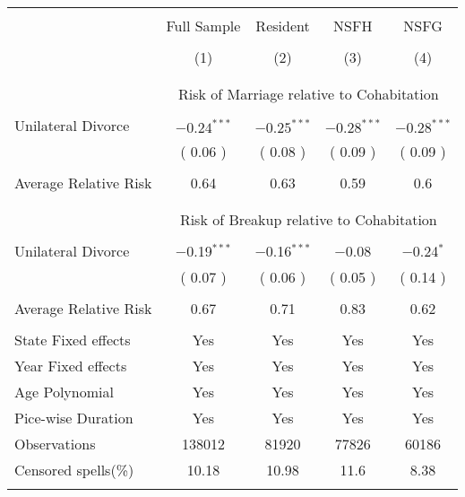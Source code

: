 \footnotesize 
\begin{tabular}{@{\extracolsep{5pt}}lcccc} 
\\[-1.8ex]\hline 
\hline 
\\[-1.8ex] & \multicolumn{1}{c}{Full Sample} & \multicolumn{1}{c}{Resident}& \multicolumn{1}{c}{NSFH}& \multicolumn{1}{c}{NSFG} \\ 
\\[-1.8ex] & \multicolumn{1}{c}{(1)} & \multicolumn{1}{c}{(2)} & \multicolumn{1}{c}{(3)} & \multicolumn{1}{c}{(4)}\\ 
\hline \\[-1.8ex] 
\\[-2.2ex] & \multicolumn{4}{c}{Risk of Marriage relative to Cohabitation} \\  
 \hline \\[-1.8ex]
 Unilateral Divorce &  $-0.24^{***}$  &  $-0.25^{***}$  &  $-0.28^{***}$  &  $-0.28^{***}$  \\ 
  & ( 0.06 ) & ( 0.08 ) & ( 0.09 ) & ( 0.09 ) \\  
 \hline \\[-1.8ex]
 Average Relative Risk &  0.64  &  0.63  &  0.59  &  0.6  \\ 
 \hline \\[-1.8ex]
 \\[-2.2ex] & \multicolumn{4}{c}{Risk of Breakup relative to Cohabitation} \\  
 \hline \\[-1.8ex]
 Unilateral Divorce &  $-$0.19$^{***}$  &  $-$0.16$^{***}$  &  $-$0.08  &  $-$0.24$^{*}$  \\ 
  & ( 0.07 ) & ( 0.06 ) & ( 0.05 ) & ( 0.14 ) \\  
 \hline \\[-1.8ex]
 Average Relative Risk &  0.67  &  0.71  &  0.83  &  0.62  \\ 
 \hline \\[-1.8ex]
State Fixed effects & Yes & Yes & Yes & Yes \\ 
Year Fixed effects & Yes & Yes & Yes & Yes \\ 
Age Polynomial & Yes & Yes & Yes & Yes \\
Pice-wise Duration & Yes & Yes & Yes & Yes \\ 
\hline
Observations & \multicolumn{1}{c}{ 138012 } & \multicolumn{1}{c}{ 81920 } & \multicolumn{1}{c}{ 77826 } & \multicolumn{1}{c}{ 60186 } \\ 
\hline
Censored spells(\%) & \multicolumn{1}{c}{ 10.18 } & \multicolumn{1}{c}{ 10.98 } & \multicolumn{1}{c}{ 11.6 } & \multicolumn{1}{c}{ 8.38 } \\ 
\hline 
\hline \\[-1.8ex] 
\end{tabular}
